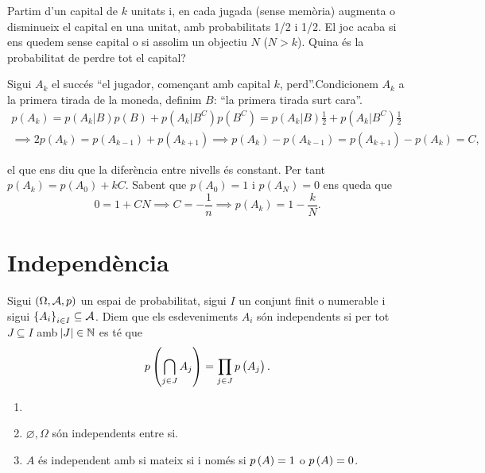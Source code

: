 \begin{problema}
    Partim d'un capital de $k$ unitats i, en cada jugada (sense memòria) augmenta o disminueix el capital en una unitat,
    amb probabilitats 1/2 i 1/2. El joc acaba si ens quedem sense capital o si assolim un objectiu $N$ ($N>k$).
    Quina és la probabilitat de perdre tot el capital?
\end{problema}
\begin{sol}
    Sigui $A_k$ el succés ``el jugador, començant amb capital $k$, perd''.Condicionem $A_k$ a la primera tirada de la moneda, 
    definim $B$: ``la primera tirada surt cara''.
    \begin{gather*}
      p(A_k) = p(A_k|B)p(B) + p(A_k|B^C)p(B^C) = p(A_k|B)\frac{1}{2} + p(A_k|B^C)\frac{1}{2}\\
      \implies 2p(A_k)=p(A_{k-1}) + p(A_{k+1}) \implies p(A_k) - p(A_{k-1}) = p(A_{k+1}) - p(A_k) = C,
    \end{gather*}

    el que ens diu que la diferència entre nivells és constant. Per tant $p(A_k) = p(A_0)+kC$. Sabent que $p(A_0)=1$ i $p(A_N)=0$ ens queda que
    \[0 = 1 + CN \implies C = -\frac{1}{n} \implies p(A_k) = 1 - \frac{k}{N}.\]
\end{sol}


\section{Independència}

\begin{defi}
    Sigui $\left( \Omega, \mathcal{A}, p\right)$ un espai de probabilitat, sigui $I$ un conjunt finit o numerable i sigui $\left\{ A_i\right\}_{i\in I} \subseteq \mathcal{A}$. Diem que els esdeveniments $A_i$ són independents si per tot $J\subseteq I$ amb $\abs{J}\in\mathbb{N}$ es té que
    \[
        p\left(\bigcap_{j\in J} A_j\right) = \prod_{j\in J} p\left( A_j\right).
    \]
\end{defi}

\begin{example}
    \begin{enumerate}[1.]
        \item[]
        \item $\varnothing, \Omega$ són independents entre si.
        \item $A$ és independent amb si mateix si i només si $p\left( A\right)=1$ o $p\left( A\right) =0$.
    \end{enumerate}
\end{example}

